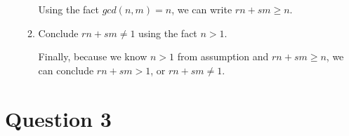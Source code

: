 \documentclass[12pt]{article}
\begin{document}
\begin{enumerate}[a.]
\begin{mdframed}
\begin{enumerate}[1.]
\begin{mdframed}
            \bigskip

            Using the fact $gcd(n,m) = n$, we can write $rn + sm \geq n$.

            \end{mdframed}

            \item Conclude $rn + sm \neq 1$ using the fact $n > 1$.

            \begin{mdframed}

            Finally, because we know $n > 1$ from assumption and $rn + sm \geq n$, we can conclude $rn + sm > 1$,
            or $rn + sm \neq 1$.

            \end{mdframed}

        \end{enumerate}
    \end{mdframed}

\end{enumerate}

\section*{Question 3}
\end{document}
